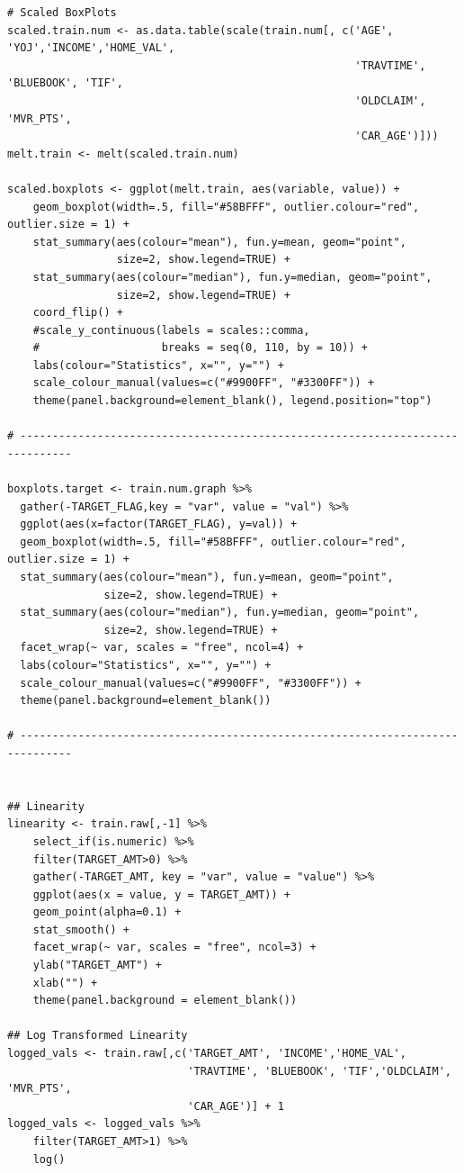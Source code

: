 \documentclass[]{article}
\begin{document}
\begin{verbatim}
# Scaled BoxPlots
scaled.train.num <- as.data.table(scale(train.num[, c('AGE', 'YOJ','INCOME','HOME_VAL',
                                                      'TRAVTIME', 'BLUEBOOK', 'TIF',
                                                      'OLDCLAIM', 'MVR_PTS',
                                                      'CAR_AGE')]))
melt.train <- melt(scaled.train.num)

scaled.boxplots <- ggplot(melt.train, aes(variable, value)) +
    geom_boxplot(width=.5, fill="#58BFFF", outlier.colour="red", outlier.size = 1) +
    stat_summary(aes(colour="mean"), fun.y=mean, geom="point",
                 size=2, show.legend=TRUE) +
    stat_summary(aes(colour="median"), fun.y=median, geom="point",
                 size=2, show.legend=TRUE) +
    coord_flip() +
    #scale_y_continuous(labels = scales::comma,
    #                   breaks = seq(0, 110, by = 10)) +
    labs(colour="Statistics", x="", y="") +
    scale_colour_manual(values=c("#9900FF", "#3300FF")) +
    theme(panel.background=element_blank(), legend.position="top")

# ------------------------------------------------------------------------------

boxplots.target <- train.num.graph %>%
  gather(-TARGET_FLAG,key = "var", value = "val") %>%
  ggplot(aes(x=factor(TARGET_FLAG), y=val)) +
  geom_boxplot(width=.5, fill="#58BFFF", outlier.colour="red", outlier.size = 1) +
  stat_summary(aes(colour="mean"), fun.y=mean, geom="point",
               size=2, show.legend=TRUE) +
  stat_summary(aes(colour="median"), fun.y=median, geom="point",
               size=2, show.legend=TRUE) +
  facet_wrap(~ var, scales = "free", ncol=4) +
  labs(colour="Statistics", x="", y="") +
  scale_colour_manual(values=c("#9900FF", "#3300FF")) +
  theme(panel.background=element_blank())

# ------------------------------------------------------------------------------


## Linearity
linearity <- train.raw[,-1] %>%
    select_if(is.numeric) %>%
    filter(TARGET_AMT>0) %>%
    gather(-TARGET_AMT, key = "var", value = "value") %>%
    ggplot(aes(x = value, y = TARGET_AMT)) +
    geom_point(alpha=0.1) +
    stat_smooth() +
    facet_wrap(~ var, scales = "free", ncol=3) +
    ylab("TARGET_AMT") +
    xlab("") +
    theme(panel.background = element_blank())

## Log Transformed Linearity
logged_vals <- train.raw[,c('TARGET_AMT', 'INCOME','HOME_VAL',
                            'TRAVTIME', 'BLUEBOOK', 'TIF','OLDCLAIM', 'MVR_PTS',
                            'CAR_AGE')] + 1
logged_vals <- logged_vals %>%
    filter(TARGET_AMT>1) %>%
    log()


\end{verbatim}
\end{document}
